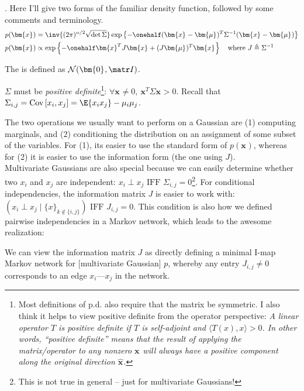 \documentclass[11pt]{article}
\renewcommand\vec[2][]{\bm{#2}_{#1}}
\newcommand\p{\Needspace{10\baselineskip} \noindent}
\begin{document}
\p {}. Here I'll give two forms of the familiar density function, followed by some comments and terminology.
\begin{align}
	p(\vec x) 
		&= \inv{(2\pi)^{n/2} \sqrt{\det \Sigma}}
			\exp\left\{ 
				-\onehalf (\vec x - \vec\mu)^T \Sigma^{-1} (\vec x - \vec\mu)
			\right\} \\
	p(\vec x) 
		&\propto \exp\left\{ - \onehalf \vec{x}^T J \vec x + (J \vec\mu)^T \vec x  \right\}
		\quad \text{where } J \triangleq \Sigma^{-1}
\end{align}
\begin{compactitem}
	\item The  is defined as $\mathcal{N}(\vec 0, \matr I)$.
	
	\item $\Sigma$ must be \textit{positive definite}\footnote{Most definitions of p.d. also require that the matrix be symmetric. I also think it helps to view positive definite from the operator perspective: \textit{A linear operator $T$ is positive definite if $T$ is self-adjoint and $\langle T(x), x \rangle > 0$. In other words, ``positive definite'' means that the result of applying the matrix/operator to any nonzero $\vec x$ will always have a positive component along the original direction $\hat{\vec x}$. }}: $\forall \vec x \ne 0, ~ \vec{x}^T \Sigma \vec x > 0$. Recall that $\Sigma_{i,j} = \text{Cov}\left[ x_i, x_j \right] = \E{x_i x_j} - \mu_i \mu_j$.
\end{compactitem}
The two operations we usually want to perform on a Gaussian are (1) computing marginals, and (2) conditioning the distribution on an assignment of some subset of the variables. For (1), its easier to use the standard form of $p(\vec x)$, whereas for (2) it is easier to use the information form (the one using $J$). \\

Multivariate Gaussians are also special because we can easily determine whether two $x_i$ and $x_j$ are independent: $x_i \perp x_j \text{  IFF  } \Sigma_{i,j}=0$\footnote{This is not true in general -- just for multivariate Gaussians!}. For conditional independencies, the information matrix $J$ is easier to work with: $(x_i \perp x_j \mid \{x\}_{k \notin \{i,j\}}) \text{  IFF  } J_{i,j}=0$. This condition is also how we defined pairwise independencies in a Markov network, which leads to the awesome realization:
\begin{definition}
	We can view the information matrix $J$ as directly defining a minimal I-map Markov network for [multivariate Gaussian] $p$, whereby any entry $J_{i,j} \ne 0$ corresponds to an edge $x_i \text{---} x_j$ in the network.
\end{definition}
\end{document}
